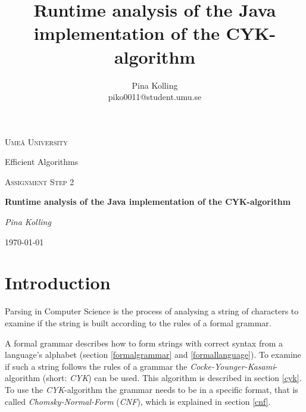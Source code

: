 \documentclass[a4paper, 11pt]{article}
\title{Runtime analysis of the Java implementation of the CYK-algorithm}
\author{Pina Kolling \\ piko0011@student.umu.se}
\begin{document}
\begin{titlepage}
	\centering
	{\scshape\LARGE Ume\r{a} University \par}
	Efficient Algorithms \par
	\vspace{1cm}
	{\scshape\Large Assignment Step 2 \par }
	\vspace{1.5cm}
	{\huge\bfseries  Runtime analysis of the Java implementation of the CYK-algorithm \par}
	\vspace{2cm}
	{\Large\itshape Pina Kolling\par}
	\vfill

	{\large \today\par}
\end{titlepage}















\setcounter{page}{1}


\newpage
\fancyhead[LO]{\empty}
{
  \hypersetup{linkcolor=black}
  \tableofcontents
}




\newpage













\section{Introduction}

Parsing in Computer Science is the process of analysing a string of characters to examine if the string is built according to the rules of a formal grammar. 

A formal grammar describes how to form strings with correct syntax from a language's alphabet (section \ref{formalgrammar} and \ref{formallanguage}).
To examine if such a string follows the rules of a grammar the \textit{Cocke-Younger-Kasami}-algorithm (short: \textit{CYK}) can be used. This algorithm is described in section \ref{cyk}. To use the \textit{CYK}-algorithm the grammar needs to be in a specific format, that is called \textit{Chomsky-Normal-Form} (\textit{CNF}), which is explained in section \ref{cnf}. \cite{CYK_name, CYK1}
\end{document}
